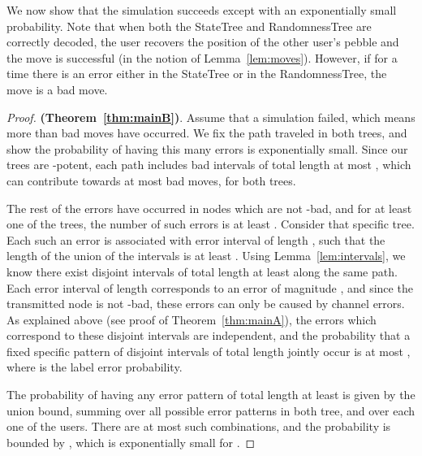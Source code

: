 \documentclass[ letterpaper, 11pt]{article}
\newcommand{\statetree}{{\textsf{StateTree}}\xspace}
\newcommand{\randomtree}{{\textsf{RandomnessTree}}\xspace}
\newcommand{\potent}{potent\xspace}
\begin{document}
We now show that the simulation succeeds except with an exponentially small probability.
Note that when both the \statetree and \randomtree are correctly decoded,
the user recovers the position of the other user's pebble and the move
is successful (in the notion of Lemma~\ref{lem:moves}).
However, if for a time  there is an error either in the \statetree or in the \randomtree,
the move is a bad move.


\begin{proof}\textbf{(Theorem~\ref{thm:mainB})}.
Assume that a simulation failed, which means more than  bad moves have occurred.
We fix the path traveled in both trees,
and show the probability of having this many errors is exponentially small.
Since our trees are -\potent, each path includes bad intervals of total length
at most , which can contribute
towards at most  bad moves, for both trees.

The rest of the errors have occurred in nodes which are not -bad, and for at least
one of the trees, the number of such errors is at least . Consider that specific tree.
Each such an error is associated with error interval of length , such that
the length of the union of the intervals is at least .
Using Lemma~\ref{lem:intervals}, we know there exist disjoint intervals of total length
at least  along the same path.
Each error interval of length  corresponds to an error of magnitude , and
since the transmitted node is not -bad, these errors can only be caused by channel errors.
As explained above (see proof of Theorem~\ref{thm:mainA}),
the errors which correspond to these disjoint intervals are independent,
and the probability that a fixed specific pattern of disjoint intervals
of total length  jointly occur
is at most , where  is the label error probability.

The probability
of having any error pattern of total length at least 
is given by the union bound, summing over
all possible error patterns in both tree, and over each one of the users. There are
at most  such combinations, and
the probability is bounded by , which is exponentially small for
.
\end{proof}
\end{document}
